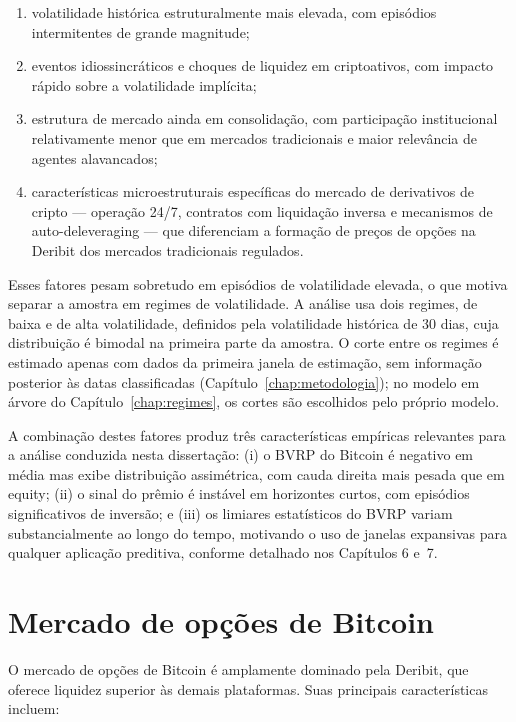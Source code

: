 \begin{enumerate}
    \item volatilidade histórica estruturalmente mais elevada, com episódios
          intermitentes de grande magnitude;
    \item eventos idiossincráticos e choques de liquidez em criptoativos, com
          impacto rápido sobre a volatilidade implícita;
    \item estrutura de mercado ainda em consolidação, com participação
          institucional relativamente menor que em mercados tradicionais e maior
          relevância de agentes alavancados;
    \item características microestruturais específicas do mercado de derivativos
          de cripto --- operação 24/7, contratos com liquidação inversa e
          mecanismos de auto-deleveraging --- que diferenciam a formação de preços
          de opções na Deribit dos mercados tradicionais regulados.
\end{enumerate}

Esses fatores pesam sobretudo em episódios de volatilidade elevada, o que
motiva separar a amostra em regimes de volatilidade. A análise usa dois
regimes, de baixa e de alta volatilidade, definidos pela volatilidade histórica
de 30 dias, cuja distribuição é bimodal na primeira parte da amostra. O corte
entre os regimes é estimado apenas com dados da primeira janela de estimação,
sem informação posterior às datas classificadas
(Capítulo~\ref{chap:metodologia}); no modelo em árvore do
Capítulo~\ref{chap:regimes}, os cortes são escolhidos pelo próprio modelo.

A combinação destes fatores produz três características empíricas relevantes para
a análise conduzida nesta dissertação: (i) o BVRP do Bitcoin é negativo em média
mas exibe distribuição assimétrica, com cauda direita mais pesada que em equity;
(ii) o sinal do prêmio é instável em horizontes curtos, com episódios
significativos de inversão; e (iii) os limiares estatísticos do BVRP variam
substancialmente ao longo do tempo, motivando o uso de janelas expansivas para
qualquer aplicação preditiva, conforme detalhado nos Capítulos 6 e~7.
\section{Mercado de opções de Bitcoin}

O mercado de opções de Bitcoin é amplamente dominado pela Deribit, que oferece
liquidez superior às demais plataformas. Suas principais características incluem:

